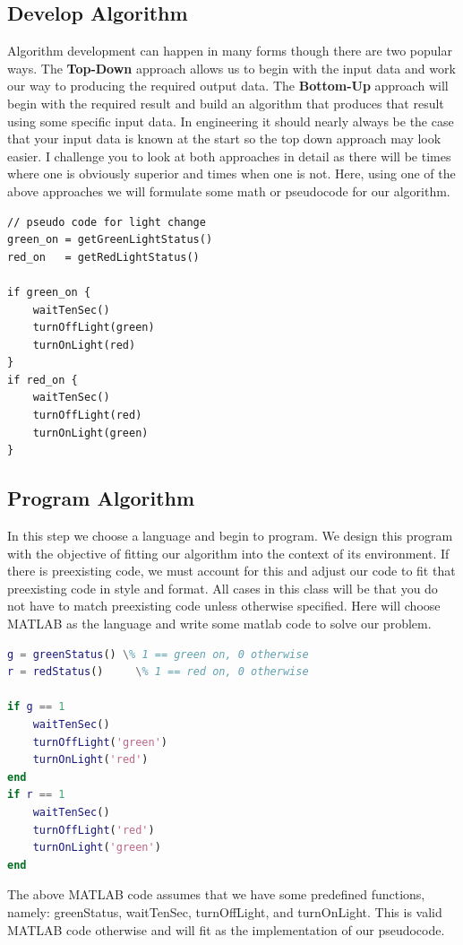 \documentclass[12pt]{article}
\begin{document}
		\subsection{Develop Algorithm}
			Algorithm development can happen in many forms though there are two popular ways.
			The \textbf{Top-Down} approach allows us to begin with the input data and work our way to producing the required output data.
			The \textbf{Bottom-Up} approach will begin with the required result and build an algorithm that produces that result using some specific input data.
			In engineering it should nearly always be the case that your input data is known at the start so the top down approach may look easier.
			I challenge you to look at both approaches in detail as there will be times where one is obviously superior and times when one is not.
			Here,
				using one of the above approaches we will formulate some math or pseudocode for our algorithm.

			\begin{lstlisting}[style=pseudocode]
// pseudo code for light change
green_on = getGreenLightStatus()
red_on   = getRedLightStatus()

if green_on {
	waitTenSec()
	turnOffLight(green)
	turnOnLight(red)
}
if red_on {
	waitTenSec()
	turnOffLight(red)
	turnOnLight(green)
}
			\end{lstlisting}

		\subsection{Program Algorithm}
			In this step we choose a language and begin to program.
			We design this program with the objective of fitting our algorithm into the context of its environment.
			If there is preexisting code,
				we must account for this and adjust our code to fit that preexisting code in style and format.
			All cases in this class will be that you do not have to match preexisting code unless otherwise specified.
			Here will choose MATLAB as the language and write some matlab code to solve our problem.
			\begin{lstlisting}[style=code, language=MATLAB]
g = greenStatus() \% 1 == green on, 0 otherwise
r = redStatus()		\% 1 == red on, 0 otherwise

if g == 1 
	waitTenSec()
	turnOffLight('green')
	turnOnLight('red')
end
if r == 1
	waitTenSec()
	turnOffLight('red')
	turnOnLight('green')
end
			\end{lstlisting}
			The above MATLAB code assumes that we have some predefined functions,
				namely: greenStatus, waitTenSec, turnOffLight, and turnOnLight.
			This is valid MATLAB code otherwise and will fit as the implementation of our pseudocode.
\end{document}
